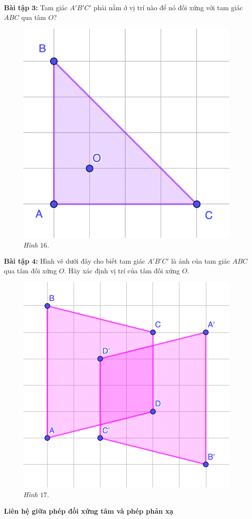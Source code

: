 \begin{multicols}{2}
	\textbf{\color{toancuabi}Bài tập $\pmb3$:} Tam giác $A'B'C'$ phải nằm ở vị trí nào để nó đối xứng với tam giác $ABC$ qua tâm $O$?
	\begin{figure}[H]
		\vspace*{5pt}
		\centering
		\captionsetup{labelformat= empty, justification=centering}
		\includegraphics[width= 0.5\linewidth]{15}
		\caption{\small\textit{\color{toancuabi}Hình $16$.}}
		\vspace*{-10pt}
	\end{figure}
	\textbf{\color{toancuabi}Bài tập $\pmb4$:} Hình vẽ dưới đây cho biết tam giác $A'B'C'$ là ảnh của tam giác $ABC$ qua tâm đối xứng $O$. Hãy xác định vị trí của tâm đối xứng $O$.
	\begin{figure}[H]
		\vspace*{-5pt}
		\centering
		\captionsetup{labelformat= empty, justification=centering}
		\includegraphics[width= 0.6\linewidth]{16}
		\caption{\small\textit{\color{toancuabi}Hình $17$.}}
		\vspace*{-5pt}
	\end{figure}
	\textbf{\color{toancuabi}Liên hệ giữa phép đối xứng tâm và phép phản xạ}

\end{multicols}
